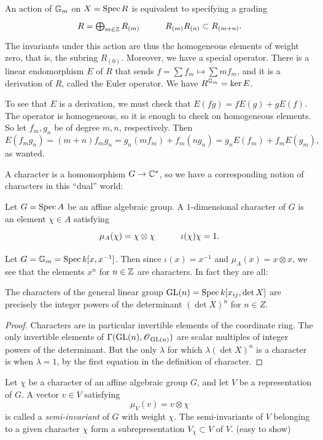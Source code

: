 \documentclass[11pt, english]{article}
\begin{document}
\begin{example}
An action of $\mathbb{G}_m$ on $X = \operatorname{Spec} R$ is equivalent to specifying a grading
\[
\xymatrix{
R = \bigoplus_{m \in \Z} R_{(m)} & R_{(m)}R_{(n)} \subset R_{(m+n)}.
}
\]
The invariants under this action are thus the homogeneous elements of weight zero, that is, the subring $R_{(0)}$. Moreover, we have a special operator. There is a linear endomorphism $E$ of $R$ that sends $f = \sum f_m \mapsto \sum m f_m$, and it is a derivation of $R$, called the Euler operator. We have $R^{\mathbb{G}_m}=\ker E$.

To see that $E$ is a derivation, we must check that $E(fg)=fE(g)+gE(f)$. The operator is homogeneous, so it is enough to check on homogeneous elements. So let $f_m,g_n$ be of degree $m,n$, respectively. Then
\[
E(f_mg_n)=(m+n)f_mg_n = g_n(mf_m)+f_m(ng_n)=g_nE(f_m)+f_mE(g_m),
\]
as wanted.
\end{example}


A character is a homomorphism $G \to \mathbb{C}^\ast$, so we have a corresponding notion of characters in this ``dual'' world:

\begin{defi}
Let $G=\operatorname{Spec} A$ be an affine algebraic group. A $1$-dimensional character of $G$ is an element $\chi \in A$ satisfying
\[
\xymatrix{
\mu_A(\chi) = \chi \otimes \chi & \iota(\chi)\chi = 1.
}
\]
\end{defi}
\begin{example}
 Let $G = \mathbb{G}_m = \operatorname{Spec} k[x,x^{-1}]$. Then since $\iota(x)=x^{-1}$ and $\mu_A(x) = x \otimes x$, we see that the elements $x^n$ for $n \in \mathbb{Z}$ are characters. In fact they are all:
\end{example}


\begin{lemma}
\label{chargl}
The characters of the general linear group $\operatorname{GL}(n) = \operatorname{Spec} k[x_{ij}, \det X]$ are precisely the integer powers of the determinant $(\det X)^n$ for $n \in Z$.
\end{lemma}
\begin{proof}
Characters are in particular invertible elements of the coordinate ring. The only invertible elements of $\Gamma(\operatorname{GL}(n),\operatorname{\mathscr{O}}_{\operatorname{GL}(n)})$ are scalar multiples of integer powers of the determinant. But the only $\lambda$ for which $\lambda( \det X)^n$ is a character is when $\lambda=1$, by the first equation in the definition of character.
\end{proof}

\begin{defi}
  Let $\chi$ be a character of an affine algebraic group $G$, and let $V$ be a representation of $G$. A vector $v \in V$ satisfying $$\mu_V(v) = v \otimes \chi$$ is called a \emph{semi-invariant} of $G$ with weight $\chi$. The semi-invariants of $V$ belonging to a given character $\chi$ form a subrepresentation $V_\chi \subset V$ of $V$. (easy to show)
\end{defi}
\end{document}
